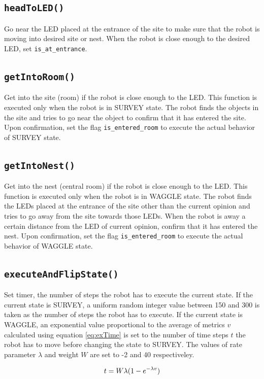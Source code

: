 \documentclass{llncs}
\begin{document}
	\subsection*{\texttt{headToLED()}}
	Go near the LED placed at the entrance of the site to make sure that the robot is moving into desired site or nest. When the robot is close enough to the desired LED, set \texttt{is\_at\_entrance}.
	
	\subsection*{\texttt{getIntoRoom()}}
	Get into the site (room) if the robot is close enough to the LED. This function is executed only when the robot is in SURVEY state. The robot finds the objects in the site and tries to go near the object to confirm that it has entered the site. Upon confirmation, set the flag \texttt{is\_entered\_room} to execute the actual behavior of SURVEY state.
	
	\subsection*{\texttt{getIntoNest()}}
	Get into the nest (central room) if the robot is close enough to the LED. This function is executed only when the robot is in WAGGLE state. The robot finds the LEDs placed at the entrance of the site other than the current opinion and tries to go away from the site towards those LEDs. When the robot is away a certain distance from the LED of current opinion, confirm that it has entered the nest. Upon confirmation, set the flag \texttt{is\_entered\_room} to execute the actual behavior of WAGGLE state.
	
	\subsection*{\texttt{executeAndFlipState()}}
	Set timer, the number of steps the robot has to execute the current state. If the current state is SURVEY, a uniform random integer value between 150 and 300 is taken as the number of steps the robot has to execute. If the current state is WAGGLE, an exponential value proportional to the average of metrics $v$ calculated using equation \eqref{eq:exTime} is set to the number of time steps $t$ the robot has to move before changing the state to SURVEY. The values of rate parameter $\lambda$ and weight $W$ are set to -2 and 40 respectiveley.
	
	\begin{equation}
		\centering
		t = W \lambda (1 - e^{-\lambda v})
		\label{eq:exTime}
	\end{equation}
	
\end{document}
